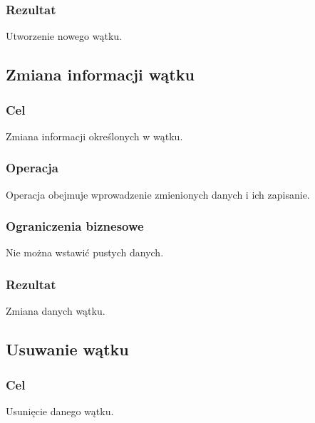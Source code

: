 \subsubsection{Rezultat}
Utworzenie nowego wątku.

\subsection{Zmiana informacji wątku}

\subsubsection{Cel}
Zmiana informacji określonych w wątku.

\subsubsection{Operacja}
Operacja obejmuje wprowadzenie zmienionych danych i ich zapisanie.

\subsubsection{Ograniczenia biznesowe}
Nie można wstawić pustych danych.

\subsubsection{Rezultat}
Zmiana danych wątku.

\subsection{Usuwanie wątku}

\subsubsection{Cel}
Usunięcie danego wątku.

